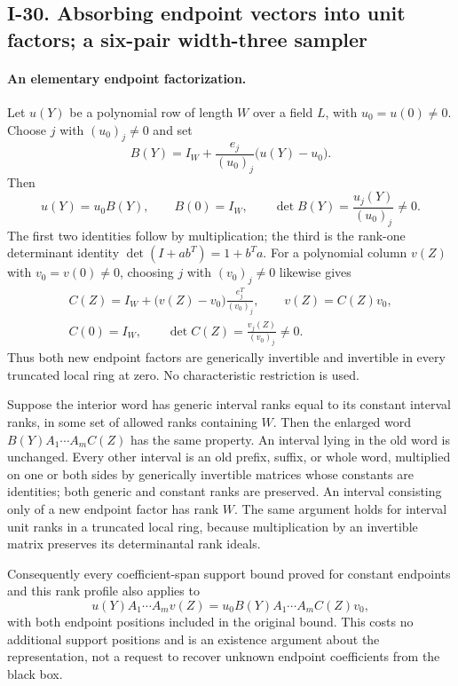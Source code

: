 \subsection{I-30. Absorbing endpoint vectors into unit factors; a six-pair width-three sampler}
\label{I-30}

\paragraph{An elementary endpoint factorization.}
Let $u(Y)$ be a polynomial row of length $W$ over a field $L$,
with $u_0=u(0)\ne0$.  Choose $j$ with $(u_0)_j\ne0$ and set
\[
 B(Y)=I_W+\frac{e_j}{(u_0)_j}\bigl(u(Y)-u_0\bigr).
 \tag{I.46}
\]
Then
\[
 u(Y)=u_0B(Y),\qquad B(0)=I_W,\qquad
 \det B(Y)=\frac{u_j(Y)}{(u_0)_j}\ne0.
\]
The first two identities follow by multiplication; the third
is the rank-one determinant identity
$\det(I+ab^T)=1+b^Ta$.
For a polynomial column $v(Z)$ with $v_0=v(0)\ne0$, choosing
$j$ with $(v_0)_j\ne0$ likewise gives
\[
 \begin{gathered}
 C(Z)=I_W+\bigl(v(Z)-v_0\bigr)\frac{e_j^T}{(v_0)_j},
 \qquad v(Z)=C(Z)v_0,\\
 C(0)=I_W,
 \qquad \det C(Z)=\frac{v_j(Z)}{(v_0)_j}\ne0.
 \end{gathered}
 \tag{I.47}
\]
Thus both new endpoint factors are generically invertible and
invertible in every truncated local ring at zero.  No
characteristic restriction is used.

Suppose the interior word has generic interval ranks equal
to its constant interval ranks, in some set of allowed ranks
containing $W$.  Then the enlarged word
$B(Y)A_1\cdots A_m C(Z)$ has the same property.  An interval
lying in the old word is unchanged.  Every other interval is
an old prefix, suffix, or whole word, multiplied on one or
both sides by generically invertible matrices whose constants
are identities; both generic and constant ranks are preserved.
An interval consisting only of a new endpoint factor has
rank $W$.  The same argument holds for interval unit ranks
in a truncated local ring, because multiplication by an
invertible matrix preserves its determinantal rank ideals.

Consequently every coefficient-span support bound proved for
constant endpoints and this rank profile also applies to
\[
 u(Y)A_1\cdots A_m v(Z)
      =u_0B(Y)A_1\cdots A_m C(Z)v_0,
\]
with both endpoint positions included in the original bound.
This costs no additional support positions and is an
existence argument about the representation, not a request
to recover unknown endpoint coefficients from the black box.

